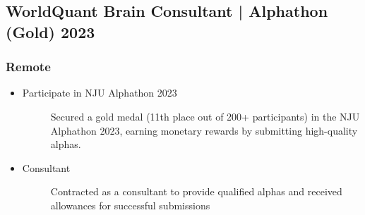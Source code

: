 \documentclass[a4paper]{article}
\begin{document}
\subsection{WorldQuant Brain Consultant | Alphathon (Gold) \normalfont  \hfill 2023}
\subsubsection{Remote}
\begin{itemize}
    \item\begin{description}
        \item[Participate in NJU Alphathon 2023] Secured a gold medal (11th place out of 200+ participants) in the NJU Alphathon 2023, earning monetary rewards by submitting high-quality alphas.
    \end{description}
    \item\begin{description}
        \item[Consultant] Contracted as a consultant to provide qualified alphas and received allowances for successful submissions 
    \end{description}
\end{itemize}  

\end{document}
